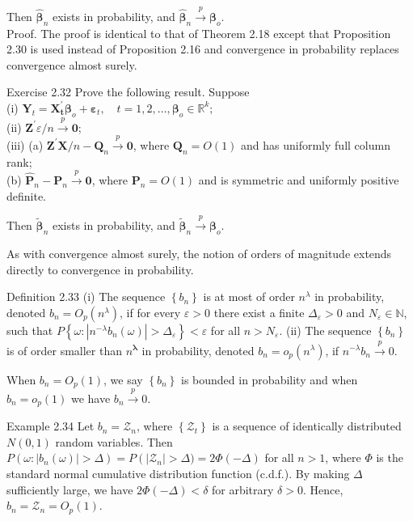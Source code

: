 \documentclass[10pt]{article}
\begin{document}
Then $\hat{\boldsymbol{\beta}}_{n}$ exists in probability, and $\hat{\boldsymbol{\beta}}_{n} \xrightarrow{p} \boldsymbol{\beta}_{o}$.\\
Proof. The proof is identical to that of Theorem 2.18 except that Proposition 2.30 is used instead of Proposition 2.16 and convergence in probability replaces convergence almost surely.

Exercise 2.32 Prove the following result. Suppose\\
(i) $\mathbf{Y}_{t}=\mathbf{X}_{\boldsymbol{t}}^{\prime} \boldsymbol{\beta}_{o}+\boldsymbol{\varepsilon}_{t}, \quad t=1,2, \ldots, \boldsymbol{\beta}_{o} \in \mathbb{R}^{k} ;$\\
(ii) $\mathbf{Z}^{\prime} \varepsilon / n \xrightarrow{p} \mathbf{0}$;\\
(iii) (a) $\mathbf{Z}^{\prime} \mathbf{X} / n-\mathbf{Q}_{n} \xrightarrow{p} \mathbf{0}$, where $\mathbf{Q}_{n}=O(1)$ and has uniformly full column rank;\\
(b) $\hat{\mathbf{P}}_{n}-\mathbf{P}_{n} \xrightarrow{p} \mathbf{0}$, where $\mathbf{P}_{n}=O(1)$ and is symmetric and uniformly positive definite.

Then $\tilde{\boldsymbol{\beta}}_{n}$ exists in probability, and $\tilde{\boldsymbol{\beta}}_{n} \xrightarrow{p} \boldsymbol{\beta}_{o}$.

As with convergence almost surely, the notion of orders of magnitude extends directly to convergence in probability.

Definition 2.33 (i) The sequence $\left\{b_{n}\right\}$ is at most of order $n^{\lambda}$ in probability, denoted $b_{n}=O_{p}\left(n^{\lambda}\right)$, if for every $\varepsilon>0$ there exist a finite $\Delta_{\varepsilon}>0$ and $N_{\varepsilon} \in \mathbb{N}$, such that $P\left\{\omega:\left|n^{-\lambda} b_{n}(\omega)\right|>\Delta_{\varepsilon}\right\}<\varepsilon$ for all $n>N_{\varepsilon}$. (ii) The sequence $\left\{b_{n}\right\}$ is of order smaller than $n^{\boldsymbol{\lambda}}$ in probability, denoted $b_{n}=o_{p}\left(n^{\lambda}\right)$, if $n^{-\lambda} b_{n} \xrightarrow{p} 0$.

When $b_{n}=O_{p}(1)$, we say $\left\{b_{n}\right\}$ is bounded in probability and when $b_{n}= o_{p}(1)$ we have $b_{n} \xrightarrow{p} 0$.

Example 2.34 Let $b_{n}=\mathcal{Z}_{n}$, where $\left\{\mathcal{Z}_{t}\right\}$ is a sequence of identically distributed $N(0,1)$ random variables. Then $P\left(\omega:\left|b_{n}(\omega)\right|>\Delta\right)=P\left(\left|\mathcal{Z}_{n}\right|>\right. \Delta)=2 \Phi(-\Delta)$ for all $n>1$, where $\Phi$ is the standard normal cumulative distribution function (c.d.f.). By making $\Delta$ sufficiently large, we have $2 \Phi(-\Delta)<\delta$ for arbitrary $\delta>0$. Hence, $b_{n}=\mathcal{Z}_{n}=O_{p}(1)$.
\end{document}
